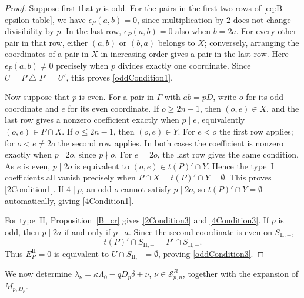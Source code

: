 \documentclass[11pt,a4paper]{amsart}
\theoremstyle{plain}
\numberwithin{equation}{section}
\newenvironment{pf}{\begin{proof}}{\end{proof}}
\begin{document}
\begin{pf}
Suppose first that \(p\) is odd. For the pairs in the first two
rows of \eqref{eq:B-epsilon-table}, we have \(\epsilon_P(a,b)=0\),
since multiplication by \(2\) does not change divisibility by \(p\).
In the last row, \(\epsilon_P(a,b)=0\) also when \(b=2a\).
For every other pair in that row, either \((a,b)\) or \((b,a)\)
belongs to \(X\); conversely, arranging the coordinates of a pair
in \(X\) in increasing order gives a pair in the last row.
Here \(\epsilon_P(a,b)\ne0\) precisely when \(p\) divides exactly
one coordinate. Since \(U=P\mathbin\triangle P'=U'\), this
proves \eqref{oddCondition1}.

Now suppose that \(p\) is even. For a pair in \(\Gamma\) with
\(ab=pD\), write \(o\) for its odd coordinate and \(e\) for
its even coordinate. If \(o\ge2n+1\), then \((o,e)\in X\),
and the last row gives a nonzero coefficient exactly when
\(p\mid e\), equivalently \((o,e)\in P\cap X\).
If \(o\le2n-1\), then \((o,e)\in Y\).
For \(e<o\) the first row applies; for \(o<e\ne2o\) the
second row applies. In both cases the coefficient is nonzero
exactly when \(p\mid2o\), since \(p\nmid o\).
For \(e=2o\), the last row gives the same condition.
As \(e\) is even, \(p\mid2o\) is equivalent to
\((o,e)\in t(P)'\cap Y\). Hence the type~\(\mathrm I\)
coefficients all vanish precisely when
\(P\cap X=t(P)'\cap Y=\emptyset\).
This proves \eqref{2Condition1}. If \(4\mid p\), an odd \(o\)
cannot satisfy \(p\mid2o\), so \(t(P)'\cap Y=\emptyset\)
automatically, giving \eqref{4Condition1}.

For type~\(\mathrm{II}\), Proposition~\ref{B_cr} gives
\eqref{2Condition3} and \eqref{4Condition3}.
If \(p\) is odd, then \(p\mid2a\) if and only if \(p\mid a\).
Since the second coordinate is even on \(S_{\mathrm{II},-}\),
\[
t(P)'\cap S_{\mathrm{II},-}
=P'\cap S_{\mathrm{II},-}.
\]
Thus \(E_P^{\mathrm{II}}=0\) is equivalent to
\(U\cap S_{\mathrm{II},-}=\emptyset\), proving
\eqref{oddCondition3}.
\end{pf}

We now determine   $\lambda_{\nu}=\kappa\Lambda_0-qD_p\delta+\nu$, \(\nu\in\mathcal S^B_{p,n}\), together with the expansion of \(M_{p,D_p}\).
\end{document}
